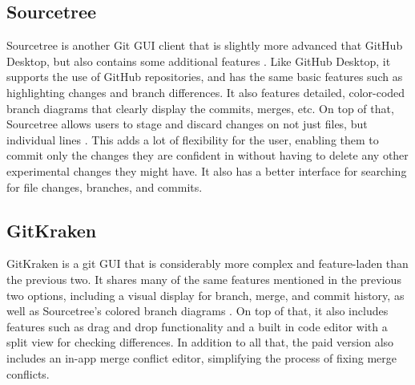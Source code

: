 \documentclass[10pt, letterpaper,draftclsnofoot,onecolumn, compsoc]{IEEEtran}
\begin{document}
\subsection{Sourcetree}
Sourcetree is another Git GUI client that is slightly more advanced that GitHub Desktop, but also contains some additional features \cite{gitgui}. Like GitHub Desktop, it supports the use of GitHub repositories, and has the same basic features such as highlighting changes and branch differences. It also features detailed, color-coded branch diagrams that clearly display the commits, merges, etc. On top of that, Sourcetree allows users to stage and discard changes on not just files, but individual lines \cite{sourcetree}. This adds a lot of flexibility for the user, enabling them to commit only the changes they are confident in without having to delete any other experimental changes they might have. It also has a better interface for searching for file changes, branches, and commits.

\subsection{GitKraken}
GitKraken is a git GUI that is considerably more complex and feature-laden than the previous two. It shares many of the same features mentioned in the previous two options, including a visual display for branch, merge, and commit history, as well as Sourcetree's colored branch diagrams \cite{gitkraken}. On top of that, it also includes features such as drag and drop functionality and a built in code editor with a split view for checking differences. In addition to all that, the paid version also includes an in-app merge conflict editor, simplifying the process of fixing merge conflicts. 
\end{document}
